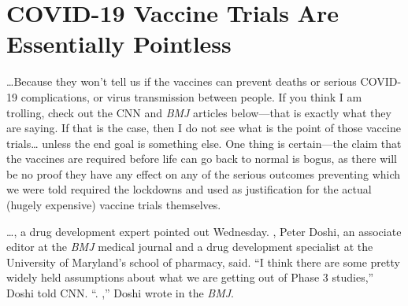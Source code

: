 \chapter{COVID-19 Vaccine Trials Are Essentially Pointless}

\begin{refsection}

\dots{}Because they won't tell us if the vaccines can prevent deaths or serious COVID-19 complications, or virus transmission between people. If you think I am trolling, check out the CNN and \textit{BMJ} articles below---that is exactly what they are saying. If that is the case, then I do not see what is the point of those vaccine trials\dots{} unless the end goal is something else. One thing is certain---the claim that the vaccines are required before life can go back to normal is bogus, as there will be no proof they have any effect on any of the serious outcomes preventing which we were told required the lockdowns and used as justification for the actual (hugely expensive) vaccine trials themselves.\textsuperscript{\cite{urle99aabeb}}

\begin{tcolorbox}[quote]

\dots{}, a drug development expert pointed out Wednesday. , Peter Doshi, an associate editor at the \textit{BMJ} medical journal and a drug development specialist at the University of Maryland's school of pharmacy, said. \enquote{I think there are some pretty widely held assumptions about what we are getting out of Phase 3 studies,} Doshi told CNN. \enquote{. ,} Doshi wrote in the \textit{BMJ}.\textsuperscript{\cite{url0dd44589}}

\end{tcolorbox}

\begin{tcolorbox}[quote]


\end{tcolorbox}
\end{refsection}
